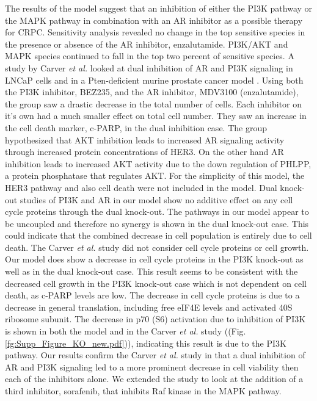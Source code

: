 \documentclass[12pt]{article}
\begin{document}
The results of the model suggest that an inhibition of either the PI3K pathway or the MAPK pathway in combination with an AR inhibitor as a possible therapy for CRPC. 
Sensitivity analysis revealed no change in the top sensitive species in the presence or absence of the AR inhibitor, enzalutamide. 
PI3K/AKT and MAPK species continued to fall in the top two percent of sensitive species. 
A study by Carver \textit{et al.} looked at dual inhibition of AR and PI3K signaling in LNCaP cells and in a Pten-deficient murine prostate cancer model \cite{Parker2013}. 
Using both the PI3K inhibitor, BEZ235, and the AR inhibitor, MDV3100 (enzalutamide), the group saw a drastic decrease in the total number of cells. 
Each inhibitor on it’s own had a much smaller effect on total cell number. They saw an increase in the cell death marker, c-PARP, in the dual inhibition case. 
The group hypothesized that AKT inhibition leads to increased AR signaling activity through increased protein concentrations of HER3. 
On the other hand AR inhibition leads to increased AKT activity due to the down regulation of PHLPP, a protein phosphatase that regulates AKT. 
For the simplicity of this model, the HER3 pathway and also cell death were not included in the model. 
Dual knock-out studies of PI3K and AR in our model show no additive effect on any cell cycle proteins through the dual knock-out. 
The pathways in our model appear to be uncoupled and therefore no synergy is shown in the dual knock-out case. 
This could indicate that the combined decrease in cell population is entirely due to cell death. 
The Carver \textit{et al.} study did not consider cell cycle proteins or cell growth. 
Our model does show a decrease in cell cycle proteins in the PI3K knock-out as well as in the dual knock-out case. 
This result seems to be consistent with the decreased cell growth in the PI3K knock-out case which is not dependent on cell death, as c-PARP levels are low. 
The decrease in cell cycle proteins is due to a decrease in general translation, including free eIF4E levels and activated 40S ribosome subunit. 
The decrease in p70 (S6) activation due to inhibition of PI3K is shown in both the model and in the Carver \textit{et al.} study ((Fig. \ref{fg:Supp_Figure_KO_new.pdf})), indicating this result is due to the PI3K pathway. 
Our results confirm the Carver \textit{et al.} study in that a dual inhibition of AR and PI3K signaling led to a more prominent decrease in cell viability then each of the inhibitors alone. 
We extended the study to look at the addition of a third inhibitor, sorafenib, that inhibits Raf kinase in the MAPK pathway.  
\end{document}

